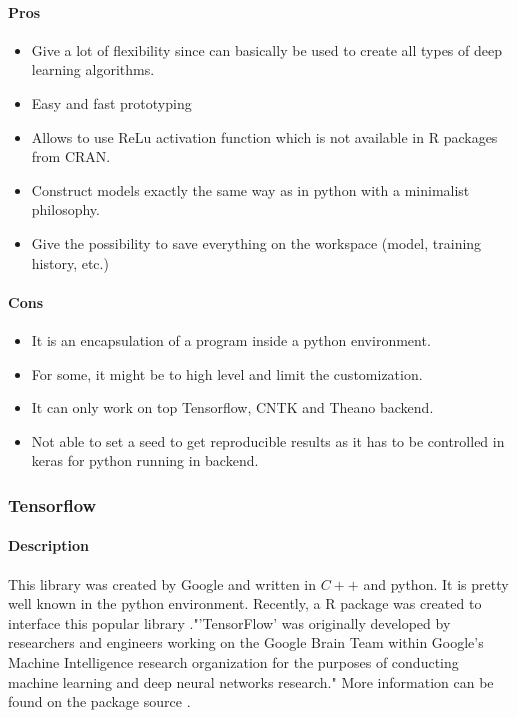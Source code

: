 \documentclass[letter,8pt]{article}\usepackage[]{graphicx}\usepackage[]{color}
\begin{document}
\paragraph{Pros}
\begin{itemize}
\item Give a lot of flexibility since can basically be used to create all types of deep learning algorithms.
\item Easy and fast prototyping
\item Allows to use ReLu activation function which is not available in R packages from CRAN.
\item Construct models exactly the same way as in python with a minimalist philosophy.
\item Give the possibility to save everything on the workspace (model, training history, etc.)
\end{itemize}
\paragraph{Cons}
\begin{itemize}
\item It is an encapsulation of a program inside a python environment.
\item For some, it might be to high level and limit the customization.
\item It can only work on top Tensorflow, CNTK and Theano backend.
\item Not able to set a seed to get reproducible results as it has to be controlled in keras for python running in backend.
\end{itemize}


\subsubsection{Tensorflow}
\paragraph{Description}
This library was created by Google and written in $C++$ and python. It is pretty well known in the python environment. Recently, a R package was created to interface this popular library ."'TensorFlow' was originally developed by researchers and engineers working on the Google Brain Team within Google's Machine Intelligence research organization for the purposes of conducting machine learning and deep neural networks research." More information can be found on the package source \cite{tensorflow2019}.
\end{document}
